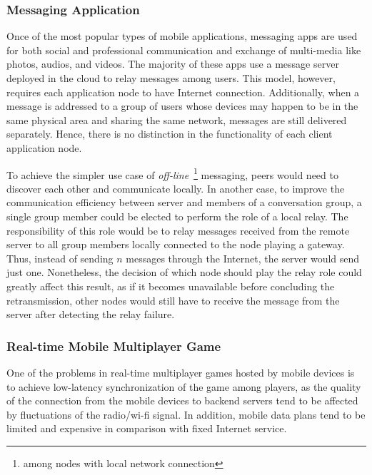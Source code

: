 \subsubsection{Messaging Application} Once of the most popular types of mobile applications, messaging apps are used for both social and professional communication and exchange of multi-media like photos, audios, and videos. The majority of these apps use a message server deployed in the cloud to relay messages among users. This model, however, requires each application node to have Internet connection. Additionally, when a message is addressed to a group of users whose devices may happen to be in the same physical area and sharing the same network, messages are still delivered separately. Hence, there is no distinction in the functionality of each client application node.  

To achieve the simpler use case of \textit{off-line}~\footnote{among nodes with local network connection} messaging, peers would need to discover each other and communicate locally. In another case, to improve the communication efficiency between server and members of a conversation group, a single group member could be elected to perform the role of a local relay. The responsibility of this role would be to relay messages received from the remote server to all group members locally connected to the node playing a gateway. Thus, instead of sending $n$ messages through the Internet, the server would send just one. Nonetheless, the decision of which node should play the relay role could greatly affect this result, as if it becomes unavailable before concluding the retransmission, other nodes would still have to receive the message from the server after detecting the relay failure.

\subsubsection{Real-time Mobile Multiplayer Game} One of the problems in real-time multiplayer games hosted by mobile devices is to achieve low-latency synchronization of the game among players, as the quality of the connection from the mobile devices to backend servers tend to be affected by fluctuations of the radio/wi-fi signal. In addition, mobile data plans tend to be limited and expensive in comparison with fixed Internet service. 

